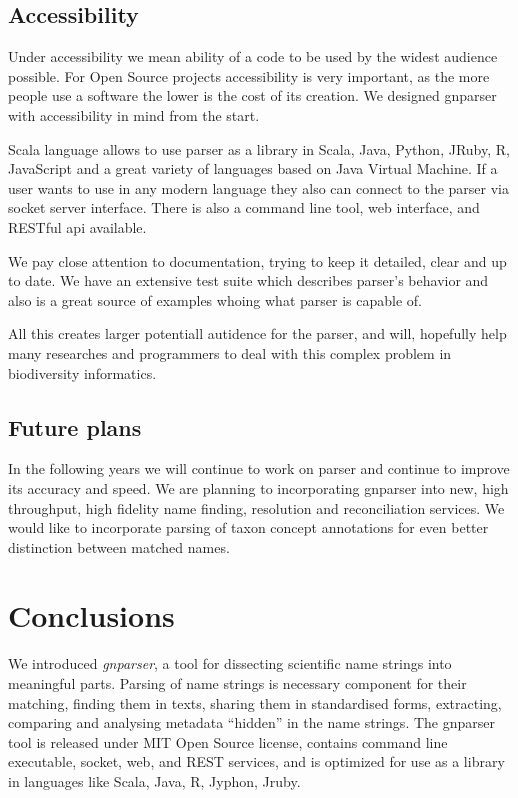 \documentclass{bmcart}
\begin{document}
\subsection*{Accessibility}

Under accessibility we mean ability of a code to be used by the widest
audience possible. For Open Source projects accessibility is very important,
as the more people use a software the lower is the cost of its creation. We
designed gnparser with accessibility in mind from the start.

Scala language allows to use parser as a library in Scala, Java, Python,
JRuby, R, JavaScript and a great variety of languages based on Java Virtual
Machine. If a user wants to use in any modern language they also can connect
to the parser via socket server interface. There is also a command line tool,
web interface, and RESTful api available.

We pay close attention to documentation, trying to keep it detailed, clear
and up to date. We have an extensive test suite which describes parser's
behavior and also is a great source of examples whoing what parser is capable
of.

All this creates larger potentiall autidence for the parser, and will,
hopefully help many researches and programmers to deal with this complex
problem in biodiversity informatics.

\subsection*{Future plans}

In the following years we will continue to work on parser and continue to
improve its accuracy and speed. We are planning to incorporating gnparser into
new, high throughput, high fidelity name finding, resolution and
reconciliation services. We would like to incorporate parsing of taxon concept
annotations for even better distinction between matched names.

\section*{Conclusions}

We introduced \textit{gnparser}, a tool for dissecting scientific name strings
into meaningful parts. Parsing of name strings is necessary component for their
matching, finding them in texts, sharing them in standardised forms,
extracting, comparing and analysing metadata ``hidden'' in the name strings.
The gnparser tool is released under MIT Open Source license, contains command
line executable, socket, web, and REST services, and is optimized for use as a
library in languages like Scala, Java, R, Jyphon, Jruby.
\end{document}
